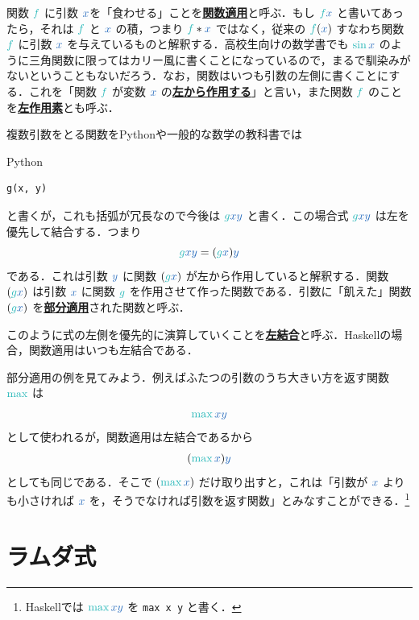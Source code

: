 \documentclass[a5paper,twoside,fleqn,draft]{jsbook}
\def\varColor{NavyBlue}
\def\funcColor{BlueGreen}
\newcommand{\programminglanguage}[1]{\textsf{#1}}
\newcommand{\haskell}{\programminglanguage{Haskell}}
\newcommand{\python}{\programminglanguage{Python}}
\newcommand{\keyword}[1]{{\underline{\textbf{#1}}}}
\newcommand{\code}[1]{\texttt{#1}}
\newenvironment{pythoncode}{\begin{itembox}[r]{\python}}{\end{itembox}}
\newcommand{\mVar}[1]{\textcolor{\varColor}{#1}}
\newcommand{\mXVar}{\mVar{x}}
\newcommand{\mYVar}{\mVar{y}}
\newcommand{\mFunc}[1]{\textcolor{\funcColor}{#1}}
\newcommand{\mSpecialFunc}[1]{\textcolor{\funcColor}{\textrm{#1}}}
\DeclareMathOperator{\mMax}{\mSpecialFunc{max}}
\DeclareMathOperator{\mSin}{\mSpecialFunc{sin}}
\begin{document}

関数 $\mFunc{f}$ に引数 $\mXVar$を「食わせる」ことを\keyword{関数適用}と呼ぶ．もし $\mFunc{f}\mXVar$ と書いてあったら，それは $\mFunc{f}$ と $\mXVar$ の積，つまり $\mFunc{f}*\mXVar$ ではなく，従来の $\mFunc{f}(\mXVar)$ すなわち関数 $\mFunc{f}$ に引数 $\mXVar$ を与えているものと解釈する．高校生向けの数学書でも $\mSin\mXVar$ のように三角関数に限ってはカリー風に書くことになっているので，まるで馴染みがないということもないだろう．なお，関数はいつも引数の左側に書くことにする．これを「関数 $\mFunc{f}$ が変数 $\mXVar$ の\keyword{左から作用する}」と言い，また関数 $\mFunc{f}$ のことを\keyword{左作用素}とも呼ぶ．

複数引数をとる関数を\python や一般的な数学の教科書では
\begin{pythoncode}
\begin{verbatim}
g(x, y)
\end{verbatim}
\end{pythoncode}
と書くが，これも括弧が冗長なので今後は $\mFunc{g}\mXVar\mYVar$ と書く．この場合式 $\mFunc{g}\mXVar\mYVar$ は左を優先して結合する．つまり
\begin{equation}
  \mFunc{g}\mXVar\mYVar=(\mFunc{g}\mXVar)\mYVar
\end{equation}
である．これは引数 $\mYVar$ に関数 $(\mFunc{g}\mXVar)$ が左から作用していると解釈する．関数 $(\mFunc{g}\mXVar)$ は引数 $\mXVar$ に関数 $\mFunc{g}$ を作用させて作った関数である．引数に「飢えた」関数 $(\mFunc{g}\mXVar)$ を\keyword{部分適用}された関数と呼ぶ．

このように式の左側を優先的に演算していくことを\keyword{左結合}と呼ぶ．\haskell の場合，関数適用はいつも左結合である．

部分適用の例を見てみよう．例えばふたつの引数のうち大きい方を返す関数
$\mMax$ は
\begin{equation}
  \mMax\mXVar\mYVar
\end{equation}
として使われるが，関数適用は左結合であるから
\begin{equation}
  (\mMax\mXVar)\mYVar
\end{equation}
としても同じである．そこで $(\mMax\mXVar)$ だけ取り出すと，これは「引数が $\mXVar$ よりも小さければ $\mXVar$ を，そうでなければ引数を返す関数」とみなすことができる．\footnote{\haskell では $\mMax\mXVar\mYVar$ を \code{max x y} と書く．}

\section{ラムダ式}
\end{document}
